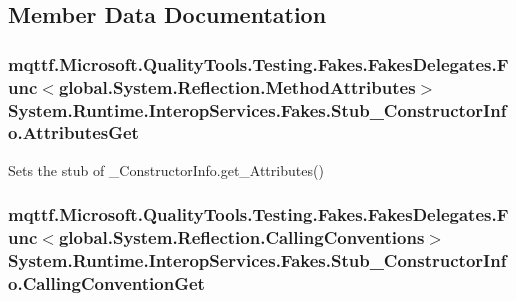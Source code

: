 \subsection{Member Data Documentation}
\hypertarget{class_system_1_1_runtime_1_1_interop_services_1_1_fakes_1_1_stub___constructor_info_aede583304698b05e9448903b2e86a44d}{
\subsubsection[{Attributes\-Get}]{\setlength{\rightskip}{0pt plus 5cm}mqttf.\-Microsoft.\-Quality\-Tools.\-Testing.\-Fakes.\-Fakes\-Delegates.\-Func$<$global.\-System.\-Reflection.\-Method\-Attributes$>$ System.\-Runtime.\-Interop\-Services.\-Fakes.\-Stub\-\_\-\-Constructor\-Info.\-Attributes\-Get}}\label{class_system_1_1_runtime_1_1_interop_services_1_1_fakes_1_1_stub___constructor_info_aede583304698b05e9448903b2e86a44d}


Sets the stub of \-\_\-\-Constructor\-Info.\-get\-\_\-\-Attributes()

\hypertarget{class_system_1_1_runtime_1_1_interop_services_1_1_fakes_1_1_stub___constructor_info_a83e0faa5249113bdfefa090490009cfc}{
\subsubsection[{Calling\-Convention\-Get}]{\setlength{\rightskip}{0pt plus 5cm}mqttf.\-Microsoft.\-Quality\-Tools.\-Testing.\-Fakes.\-Fakes\-Delegates.\-Func$<$global.\-System.\-Reflection.\-Calling\-Conventions$>$ System.\-Runtime.\-Interop\-Services.\-Fakes.\-Stub\-\_\-\-Constructor\-Info.\-Calling\-Convention\-Get}}\label{class_system_1_1_runtime_1_1_interop_services_1_1_fakes_1_1_stub___constructor_info_a83e0faa5249113bdfefa090490009cfc}


